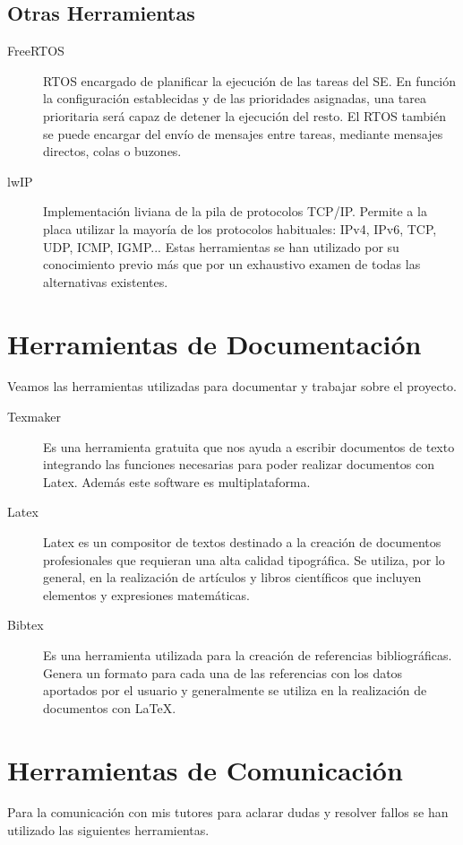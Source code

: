 \subsection{Otras Herramientas}

\begin{description}
\item[FreeRTOS]
RTOS encargado de planificar la ejecución de las tareas del SE.
En función la configuración establecidas y de las prioridades asignadas, una tarea prioritaria será capaz de detener la ejecución del resto. El RTOS también se puede encargar del envío de mensajes entre tareas, mediante mensajes directos, colas o buzones.
\item[lwIP]
Implementación liviana de la pila de protocolos TCP/IP. Permite a la placa utilizar la mayoría de los protocolos habituales: IPv4, IPv6, TCP, UDP, ICMP, IGMP... Estas herramientas se han utilizado por su conocimiento previo más que por un exhaustivo examen de todas las alternativas existentes.
\end{description}


\section{Herramientas de Documentación}\label{sec:HDocumentacion}
Veamos las herramientas utilizadas para documentar y trabajar sobre el proyecto.

\begin{description}
\item[Texmaker]
Es una herramienta gratuita que nos ayuda a escribir documentos de texto integrando las funciones necesarias para poder realizar documentos con Latex. Además este software es multiplataforma.
\item[Latex]
Latex es un compositor de textos destinado a la creación de documentos profesionales que requieran una alta calidad tipográfica. Se utiliza, por lo general, en la realización de artículos y libros científicos que incluyen elementos y expresiones matemáticas.
\item[Bibtex]
Es una herramienta utilizada para la creación de referencias bibliográficas. Genera un formato para cada una de las referencias con los datos aportados por el usuario y generalmente se utiliza en la realización de documentos con LaTeX.
\end{description}

\section{Herramientas de Comunicación}\label{sec:HComunicacion}
Para la comunicación con mis tutores para aclarar dudas y resolver fallos se han utilizado las siguientes herramientas.

